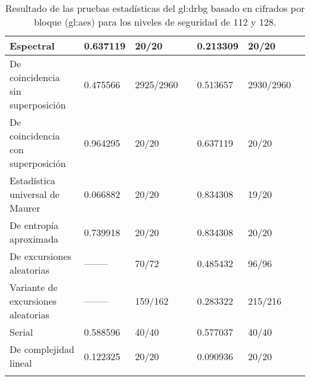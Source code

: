 \begin{longtable}{| m{2.4in} | C{0.65in} | C{0.85in} |
C{0.15in} | C{0.65in} | C{0.85in} | C{0.15in} |}
  Espectral &
  0.637119 &   20/20   &  &
  0.213309 &   20/20   &  \\\hline

  De coincidencia sin superposición &
  0.475566 & 2925/2960 &  &
  0.513657 & 2930/2960 &  \\\hline

  De coincidencia con superposición &
  0.964295 &   20/20   &  &
  0.637119 &   20/20   &  \\\hline

  Estadística universal de Maurer &
  0.066882 &   20/20   &  &
  0.834308 &   19/20   &  \\\hline

  De entropía aproximada &
  0.739918 &   20/20   &  &
  0.834308 &   20/20   &  \\\hline

  De excursiones aleatorias &
  -------- &   70/72   &  &
  0.485432 &   96/96   &  \\\hline

  Variante de excursiones aleatorias &
  -------- &  159/162  &  &
  0.283322 &  215/216  &  \\\hline

  Serial &
  0.588596 &   40/40   &  &
  0.577037 &   40/40   &  \\\hline

  De complejidad lineal &
  0.122325 &   20/20   &  &
  0.090936 &   20/20   &  \\\hline

  \caption{Resultado de las pruebas estadísticas del \gls{gl:drbg} basado
  en cifrados por bloque (\gls{gl:aes}) para los niveles de seguridad de
  112 y 128.}
  \label{resultados_pruebas_drbg_bloque_112_128}

\end{longtable}


